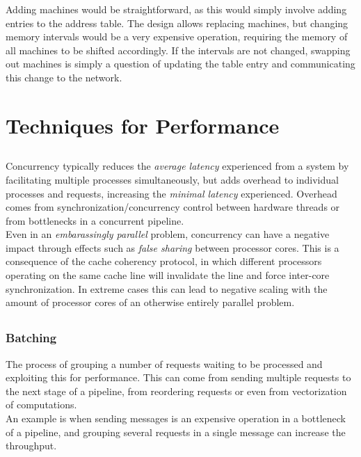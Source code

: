 \documentclass[12pt]{article}
\begin{document}
Adding machines would be straightforward, as this would simply involve adding entries to the address table. The design allows replacing machines, but changing memory intervals would be a very expensive operation, requiring the memory of all machines to be shifted accordingly. If the intervals are not changed, swapping out machines is simply a question of updating the table entry and communicating this change to the network.

\section{Techniques for Performance}

\subsection{} %

Concurrency typically reduces the \emph{average latency} experienced from a system by facilitating multiple processes simultaneously, but adds overhead to individual processes and requests, increasing the \emph{minimal latency} experienced. Overhead comes from synchronization/concurrency control between hardware threads or from bottlenecks in a concurrent pipeline. \\
Even in an \emph{embarassingly parallel} problem, concurrency can have a negative impact through effects such as \emph{false sharing} between processor cores. This is a consequence of the cache coherency protocol, in which different processors operating on the same cache line will invalidate the line and force inter-core synchronization. In extreme cases this can lead to negative scaling with the amount of processor cores of an otherwise entirely parallel problem.

\subsection{} %

\subsubsection*{Batching}
The process of grouping a number of requests waiting to be processed and exploiting this for performance. This can come from sending multiple requests to the next stage of a pipeline, from reordering requests or even from vectorization of computations. \\
An example is when sending messages is an expensive operation in a bottleneck of a pipeline, and grouping several requests in a single message can increase the throughput.
\end{document}
